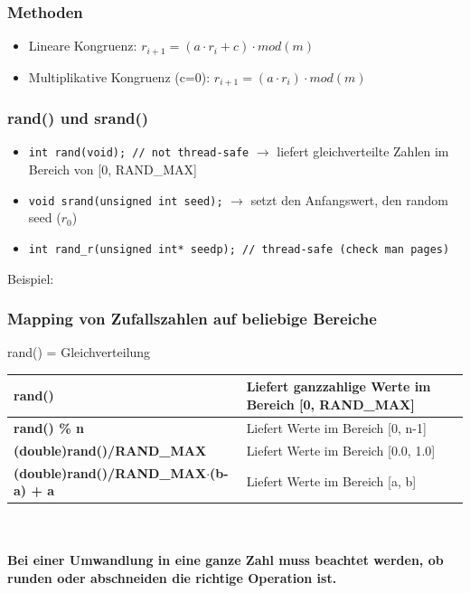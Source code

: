 \subsubsection{Methoden}
\begin{itemize}
    \item Lineare Kongruenz: $r_{i+1} = (a \cdot r_i + c)\cdot mod (m)$
    \item Multiplikative Kongruenz (c=0): $r_{i+1} = (a \cdot r_i)\cdot mod (m)$
\end{itemize}

\subsubsection{rand() und srand()}
\begin{itemize}
    \item \lstinline{int rand(void); // not thread-safe} $\rightarrow$ liefert gleichverteilte Zahlen im Bereich von [0, RAND\_MAX]
    \item \lstinline{void srand(unsigned int seed);} $\rightarrow$ setzt den Anfangswert, den random seed ($r_0$)
		\item \lstinline{int rand_r(unsigned int* seedp); // thread-safe (check man pages)}
\end{itemize}
Beispiel:


\subsubsection{Mapping von Zufallszahlen auf beliebige Bereiche}
rand() = Gleichverteilung\\

\begin{tabular}{|l|l|}
	\hline
	\textbf{rand()} & Liefert ganzzahlige Werte im Bereich [0, RAND\_MAX] \\
	\hline
	\textbf{rand() \% n} & Liefert Werte im Bereich [0, n-1] \\
	\hline
	\textbf{(double)rand()/RAND\_MAX} & Liefert Werte im Bereich [0.0, 1.0] \\
	\hline
	\textbf{(double)rand()/RAND\_MAX$\cdot$(b-a) + a} & Liefert Werte im Bereich [a, b] \\
	\hline
\end{tabular} \\\\

\textbf{Bei einer Umwandlung in eine ganze Zahl muss beachtet werden, ob runden oder abschneiden die richtige Operation ist.}\\

